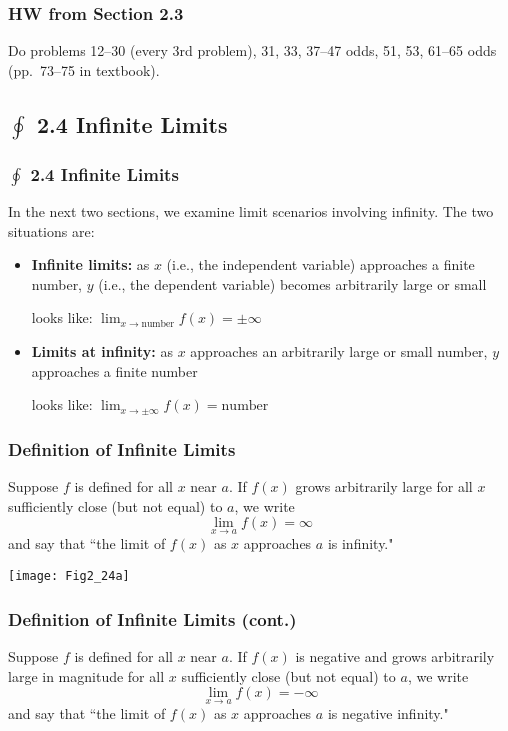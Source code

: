 \documentclass[14pt]{beamer}
\begin{document}
\begin{frame}
\frametitle{HW from Section 2.3}
Do problems 12--30 (every 3rd problem), 31, 33, 37--47 odds, 51, 53, 61--65 odds (pp.\ 73--75 in textbook).
\end{frame}

\begin{frame}
\subsection[2.4 Infinite Limits]{$\oint$ 2.4 Infinite Limits}
\frametitle{$\oint$ 2.4 Infinite Limits}
\footnotesize
In the next two sections, we examine limit scenarios involving infinity.  The two situations are:
\begin{itemize}
\item {\bf Infinite limits:}  as $x$ (i.e., the independent variable) approaches a finite number, $y$ (i.e., the dependent variable) becomes arbitrarily large or small

\vspace{0.5pc}
\hspace{50pt}looks like: $\displaystyle\lim_{x\to\text{number}}f(x)=\pm\infty$
\item {\bf Limits at infinity:} as $x$ approaches an arbitrarily large or small number, $y$ approaches a finite number

\vspace{0.5pc}
\hspace{50pt}looks like: $\displaystyle\lim_{x\to\pm\infty}f(x)=\text{number}$
\end{itemize}
\end{frame}

\begin{frame}
\frametitle{Definition of Infinite Limits}
Suppose $f$ is defined for all $x$ near $a$.  If $f(x)$ grows arbitrarily large for all $x$ sufficiently close (but not equal) to $a$, we write
\[\lim_{x \to a} f(x) = \infty\]
and say that \alert{``the limit of $f(x)$ as $x$ approaches $a$ is infinity."}
\end{frame}

\begin{frame}
\begin{center}
\noindent\texttt{[image: Fig2\_24a]}
\end{center}
\end{frame}

\begin{frame}
\frametitle{Definition of Infinite Limits (cont.)}
Suppose $f$ is defined for all $x$ near $a$.  If $f(x)$ is negative and grows arbitrarily large in magnitude for all $x$ sufficiently close (but not equal) to $a$, we write
\[\lim_{x \to a} f(x) = -\infty\]
and say that \alert{``the limit of $f(x)$ as $x$ approaches $a$ is negative infinity."}
\end{frame}
\end{document}
